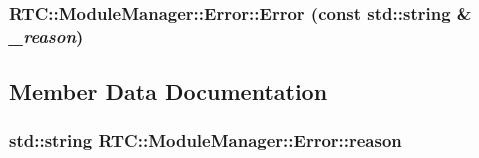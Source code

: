 \subsubsection[{Error}]{\setlength{\rightskip}{0pt plus 5cm}RTC::ModuleManager::Error::Error (const std::string \& {\em \_\-reason})\hspace{0.3cm}{\ttfamily  [inline]}}\label{structRTC_1_1ModuleManager_1_1Error_a56f039f9b9dbb5917cce4e9cd99ce01b}


\subsection{Member Data Documentation}
\subsubsection[{reason}]{\setlength{\rightskip}{0pt plus 5cm}std::string {\bf RTC::ModuleManager::Error::reason}}\label{structRTC_1_1ModuleManager_1_1Error_a0061f5a32edb04ca1376b20675f96b3f}

